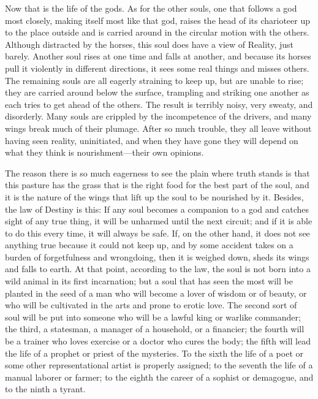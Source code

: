 Now that is the life of the gods. As for the other
souls, one that follows a god most closely, making itself most like that
god, raises the head of its charioteer up to the place outside and is
carried around in the circular motion with the others. Although
distracted by the horses, this soul does have a view of Reality, just
barely. Another soul rises at one time and falls at another, and because
its horses pull it violently in different directions, it sees some real
things and misses others. The remaining souls are all eagerly straining
to keep up, but are unable to rise; they are carried around below the
surface, trampling and striking one another as each tries to get
ahead of the others. The result is terribly noisy, very sweaty, and
disorderly. Many souls are crippled by the incompetence of the drivers,
and many wings break much of their plumage. After so much trouble, they
all leave without having seen reality, uninitiated, and when they have
gone they will depend on what they think is nourishment---their own
opinions.

The reason there is so much eagerness to see the plain where truth 
stands is that this pasture has the grass that is the right food
for the best part of the soul, and it is the nature of the wings that
lift up the soul to be nourished by it. Besides, the law of Destiny is
this: If any soul becomes a companion to a god and catches sight of any
true thing, it will be unharmed until the next circuit; and if it is
able to do this every time, it will always be safe. If, on the other
hand, it does not see anything true because it could not keep up, and by
some accident takes on a burden of forgetfulness and wrongdoing, then it
is weighed down, sheds its wings and falls to earth. At that
point, according to the law, the soul is not born into a wild animal in
its first incarnation; but a soul that has seen the most will be planted
in the seed of a man who will become a lover of
wisdom or of beauty,
or who will be cultivated in the arts and prone to erotic love. The
second sort of soul will be put into someone who will be a lawful king
or warlike commander; the third, a statesman, a manager of a household,
or a financier; the fourth will be a trainer who loves exercise or a
doctor who cures the body; the fifth will lead the life of a
prophet or priest of the mysteries. To the sixth the life of a poet or
some other representational artist is properly assigned; to the seventh
the life of a manual laborer or farmer; to the eighth the career of a
sophist or demagogue, and to the ninth a tyrant.

